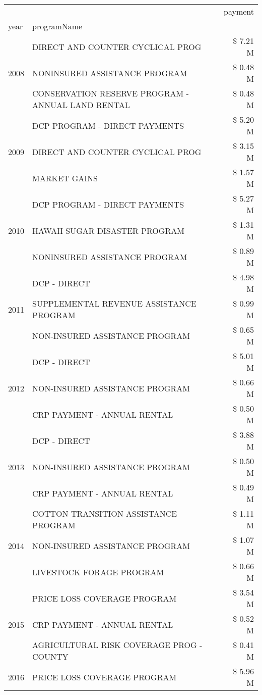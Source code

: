 \begin{tabular}{llr}
\toprule
 &  & payment \\
year & programName &  \\
\midrule
\multirow[t]{3}{*}{2008} & DIRECT AND COUNTER CYCLICAL PROG & \$ 7.21 M \\
 & NONINSURED ASSISTANCE PROGRAM & \$ 0.48 M \\
 & CONSERVATION RESERVE PROGRAM - ANNUAL LAND RENTAL & \$ 0.48 M \\
\cline{1-3}
\multirow[t]{3}{*}{2009} & DCP PROGRAM - DIRECT PAYMENTS & \$ 5.20 M \\
 & DIRECT AND COUNTER CYCLICAL PROG & \$ 3.15 M \\
 & MARKET GAINS & \$ 1.57 M \\
\cline{1-3}
\multirow[t]{3}{*}{2010} & DCP PROGRAM - DIRECT PAYMENTS & \$ 5.27 M \\
 & HAWAII SUGAR DISASTER PROGRAM & \$ 1.31 M \\
 & NONINSURED ASSISTANCE PROGRAM & \$ 0.89 M \\
\cline{1-3}
\multirow[t]{3}{*}{2011} & DCP - DIRECT & \$ 4.98 M \\
 & SUPPLEMENTAL REVENUE ASSISTANCE PROGRAM & \$ 0.99 M \\
 & NON-INSURED ASSISTANCE PROGRAM & \$ 0.65 M \\
\cline{1-3}
\multirow[t]{3}{*}{2012} & DCP - DIRECT & \$ 5.01 M \\
 & NON-INSURED ASSISTANCE PROGRAM & \$ 0.66 M \\
 & CRP PAYMENT - ANNUAL RENTAL & \$ 0.50 M \\
\cline{1-3}
\multirow[t]{3}{*}{2013} & DCP - DIRECT & \$ 3.88 M \\
 & NON-INSURED ASSISTANCE PROGRAM & \$ 0.50 M \\
 & CRP PAYMENT - ANNUAL RENTAL & \$ 0.49 M \\
\cline{1-3}
\multirow[t]{3}{*}{2014} & COTTON TRANSITION ASSISTANCE PROGRAM & \$ 1.11 M \\
 & NON-INSURED ASSISTANCE PROGRAM & \$ 1.07 M \\
 & LIVESTOCK FORAGE PROGRAM & \$ 0.66 M \\
\cline{1-3}
\multirow[t]{3}{*}{2015} & PRICE LOSS COVERAGE PROGRAM & \$ 3.54 M \\
 & CRP PAYMENT - ANNUAL RENTAL & \$ 0.52 M \\
 & AGRICULTURAL RISK COVERAGE PROG - COUNTY & \$ 0.41 M \\
\cline{1-3}
\multirow[t]{3}{*}{2016} & PRICE LOSS COVERAGE PROGRAM                   & \$ 5.96 M \\

\end{tabular}
